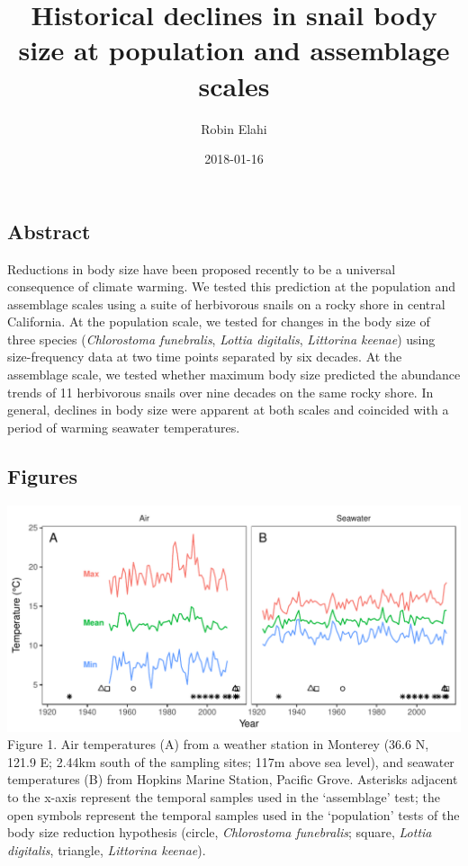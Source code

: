 \documentclass[11pt,]{article}
\title{Historical declines in snail body size at population and assemblage
scales}
\author{Robin Elahi}
\date{2018-01-16}
\begin{document}
\maketitle

\subsection{Abstract}\label{abstract}

Reductions in body size have been proposed recently to be a universal
consequence of climate warming. We tested this prediction at the
population and assemblage scales using a suite of herbivorous snails on
a rocky shore in central California. At the population scale, we tested
for changes in the body size of three species (\emph{Chlorostoma
funebralis}, \emph{Lottia digitalis}, \emph{Littorina keenae}) using
size-frequency data at two time points separated by six decades. At the
assemblage scale, we tested whether maximum body size predicted the
abundance trends of 11 herbivorous snails over nine decades on the same
rocky shore. In general, declines in body size were apparent at both
scales and coincided with a period of warming seawater temperatures.

\newpage

\subsection{Figures}\label{figures}

\includegraphics{../../figs_ms/plot_temp_timeseries.pdf} Figure 1. Air
temperatures (A) from a weather station in Monterey (36.6 N, 121.9 E;
2.44km south of the sampling sites; 117m above sea level), and seawater
temperatures (B) from Hopkins Marine Station, Pacific Grove. Asterisks
adjacent to the x-axis represent the temporal samples used in the
`assemblage' test; the open symbols represent the temporal samples used
in the `population' tests of the body size reduction hypothesis (circle,
\emph{Chlorostoma funebralis}; square, \emph{Lottia digitalis},
triangle, \emph{Littorina keenae}).
\end{document}

